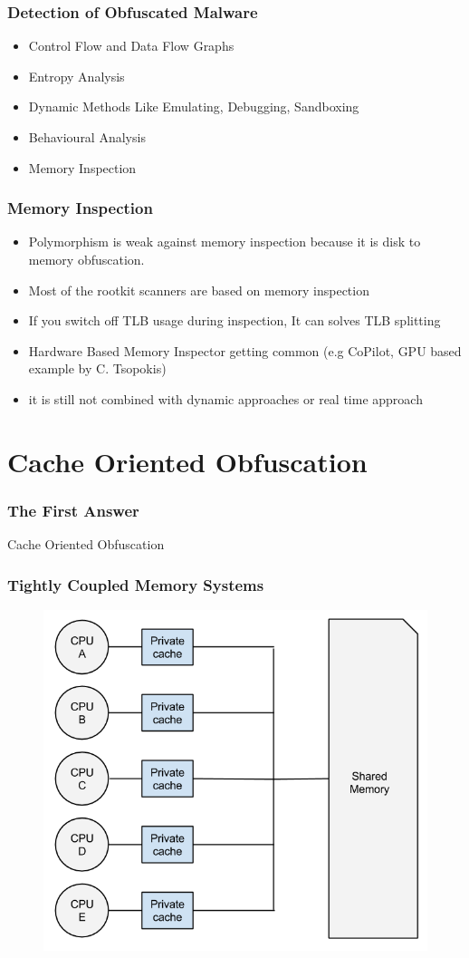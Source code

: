 \documentclass{beamer}
\begin{document}
\begin{frame}
	\frametitle{Detection of Obfuscated Malware}
	\begin{itemize}
		\item Control Flow and Data Flow Graphs
		\item Entropy Analysis
		\item Dynamic Methods Like Emulating, Debugging, Sandboxing
		\item Behavioural Analysis
		\item Memory Inspection
	\end{itemize}
\end{frame}

\begin{frame}
	\frametitle{Memory Inspection}
	\begin{itemize}
		\item Polymorphism is weak against memory inspection because it is disk to memory obfuscation.
		\item Most of the rootkit scanners are based on memory inspection
		\item If you switch off TLB usage during inspection, It can solves TLB splitting
		\item Hardware Based Memory Inspector getting common (e.g CoPilot, GPU based example by C. Tsopokis)
		\item it is still not combined with dynamic approaches or real time approach
	\end{itemize}
\end{frame}



\section{Cache Oriented Obfuscation}
\begin{frame}
	\frametitle{The First Answer}
	\huge{\centerline{Cache Oriented Obfuscation}}
\end{frame}

\begin{frame}
	\frametitle{Tightly Coupled Memory Systems}
		\begin{figure}
			\includegraphics[width=0.6\linewidth]{img/tightly_coupled_memories.png}
		\end{figure}
\end{frame}
\end{document}
